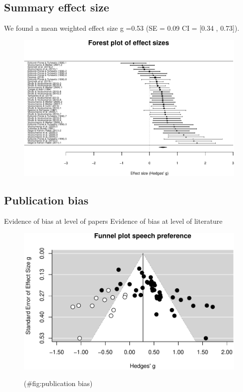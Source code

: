 \documentclass[man]{apa6}
\begin{document}
\subsection{Summary effect size}\label{summary-effect-size}

We found a mean weighted effect size g =0.53 (SE = 0.09 CI = {[}0.34 ,
0.73{]}).

\begin{figure}
\centering
\includegraphics{MA_speech_pref_files/figure-latex/forest plot-1.pdf}
\caption{}
\end{figure}

\subsection{Publication bias}\label{publication-bias}

Evidence of bias at level of papers Evidence of bias at level of
literature

\begin{figure}

{\centering \includegraphics{MA_speech_pref_files/figure-latex/publication bias-1} 

}

\caption{ }(\#fig:publication bias)
\end{figure}
\end{document}
